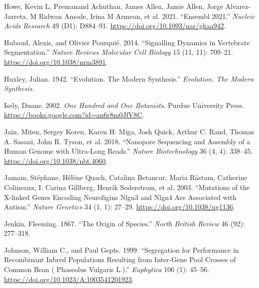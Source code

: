 \documentclass[
]{book}
\newlength{\cslhangindent}
\newlength{\cslentryspacingunit} %
\newenvironment{CSLReferences}[2] %
 {%
  \setlength{\parindent}{0pt}
  \ifodd #1
  \let\oldpar\par
  \def\par{\hangindent=\cslhangindent\oldpar}
  \fi
  \setlength{\parskip}{#2\cslentryspacingunit}
 }%
 {}
\begin{document}
\begin{CSLReferences}{1}{0}
\leavevmode{}%
Howe, Kevin L, Premanand Achuthan, James Allen, Jamie Allen, Jorge Alvarez-Jarreta, M Ridwan Amode, Irina M Armean, et al. 2021. {``Ensembl 2021.''} \emph{Nucleic Acids Research} 49 (D1): D884--91. \url{https://doi.org/10.1093/nar/gkaa942}.

\leavevmode{}%
Hubaud, Alexis, and Olivier Pourquié. 2014. {``Signalling Dynamics in Vertebrate Segmentation.''} \emph{Nature Reviews Molecular Cell Biology} 15 (11, 11): 709--21. \url{https://doi.org/10.1038/nrm3891}.

\leavevmode{}%
Huxley, Julian. 1942. {``Evolution. {The} Modern Synthesis.''} \emph{Evolution. The Modern Synthesis.}

\leavevmode{}%
Isely, Duane. 2002. \emph{One {Hundred} and {One Botanists}}. {Purdue University Press}. \url{https://books.google.com?id=an6r8m0JfV8C}.

\leavevmode{}%
Jain, Miten, Sergey Koren, Karen H. Miga, Josh Quick, Arthur C. Rand, Thomas A. Sasani, John R. Tyson, et al. 2018. {``Nanopore Sequencing and Assembly of a Human Genome with Ultra-Long Reads.''} \emph{Nature Biotechnology} 36 (4, 4): 338--45. \url{https://doi.org/10.1038/nbt.4060}.

\leavevmode{}%
Jamain, Stéphane, Hélène Quach, Catalina Betancur, Maria Råstam, Catherine Colineaux, I. Carina Gillberg, Henrik Soderstrom, et al. 2003. {``Mutations of the {X-linked} Genes Encoding Neuroligins {Nlgn3} and {Nlgn4} Are Associated with Autism.''} \emph{Nature Genetics} 34 (1, 1): 27--29. \url{https://doi.org/10.1038/ng1136}.

\leavevmode{}%
Jenkin, Fleeming. 1867. {``The Origin of Species.''} \emph{North British Review} 46 (92): 277--318.

\leavevmode{}%
Johnson, William C., and Paul Gepts. 1999. {``Segregation for Performance in Recombinant Inbred Populations Resulting from Inter-Gene Pool Crosses of Common Bean ( {Phaseolus} Vulgaris {L}.).''} \emph{Euphytica} 106 (1): 45--56. \url{https://doi.org/10.1023/A:1003541201923}.


\end{CSLReferences}
\end{document}
